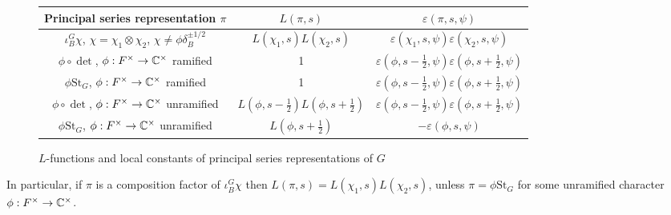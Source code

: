 \begin{figure}[!ht]
    \centering
    \begin{tabular}{ |c|c|c| }
        \hline
        Principal series representation $\pi$ & $L(\pi,s)$ & $\varepsilon(\pi,s,\psi)$ \\ \hline
        $\iota_B^G \chi$, $\chi=\chi_1\otimes \chi_2$, $\chi \neq \phi \delta_B^{\pm 1/2}$ & $L(\chi_1,s)L(\chi_2,s)$ & $\varepsilon(\chi_1,s,\psi)\varepsilon(\chi_2,s,\psi)$ \\ 
        $\phi \circ \det$, $\phi :F^\times \to \mathbb{C}^\times$ ramified & 1 & $\varepsilon(\phi,s-\frac{1}{2},\psi)\varepsilon(\phi,s+\frac{1}{2},\psi)$ \\ 
        $\phi \mathrm{St}_G$, $\phi :F^\times \to \mathbb{C}^\times$ ramified & 1 & $\varepsilon(\phi,s-\frac{1}{2},\psi)\varepsilon(\phi,s+\frac{1}{2},\psi)$ \\  
        $\phi \circ \det$, $\phi :F^\times \to \mathbb{C}^\times$ unramified & $L(\phi,s-\frac{1}{2})L(\phi,s+\frac{1}{2})$ & $\varepsilon(\phi,s-\frac{1}{2},\psi)\varepsilon(\phi,s+\frac{1}{2},\psi)$ \\ 
        $\phi \mathrm{St}_G$, $\phi :F^\times \to \mathbb{C}^\times$ unramified & $L(\phi,s+\frac{1}{2})$ & $-\varepsilon(\phi,s,\psi)$ \\     
        \hline
       \end{tabular}
       \caption{$L$-functions and local constants of principal series representations of $G$}
       \label{table:Lfunc}
\end{figure}

In particular, if $\pi$ is a composition factor of $\iota_B^G \chi$ then $L(\pi,s) = L(\chi_1,s)L(\chi_2,s)$, unless $\pi = \phi \mathrm{St}_G$ for some unramified character $\phi : F^\times \to \mathbb{C}^\times$.
